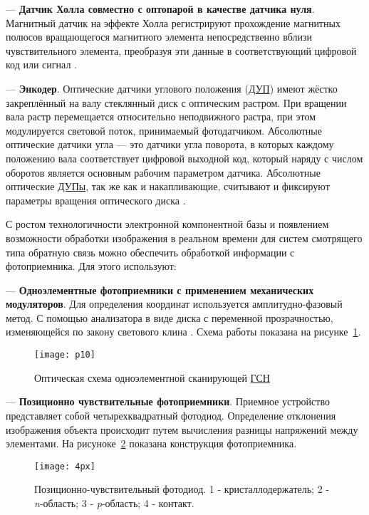 --- \textbf{Датчик Холла совместно с оптопарой в качестве датчика нуля}. Магнитный датчик на эффекте Холла регистрируют прохождение магнитных полюсов вращающегося магнитного элемента непосредственно вблизи чувствительного элемента, преобразуя эти данные в соответствующий цифровой код или сигнал \cite[]{Encoder}.
	
--- \textbf{Энкодер}. Оптические датчики углового положения (\hyperref[acroDUP]{ДУП}) имеют жёстко закреплённый на валу стеклянный диск с оптическим растром. При вращении вала растр перемещается относительно неподвижного растра, при этом модулируется световой поток, принимаемый фотодатчиком. Абсолютные оптические датчики угла — это датчики угла поворота, в которых каждому положению вала соответствует цифровой выходной код, который наряду с числом оборотов является основным рабочим параметром датчика. Абсолютные оптические \hyperref[acroDUP]{ДУПы}, так же как и накапливающие, считывают и фиксируют параметры вращения оптического диска \cite[]{Encoder}.

С ростом технологичности электронной компонентной базы и появлением возможности обработки изображения в реальном времени для систем смотрящего типа обратную связь можно обеспечить обработкой информации с фотоприемника. Для этого используют:

--- \textbf{Одноэлементные фотоприемники с применением механических модуляторов}. Для определения координат используется амплитудно-фазовый метод. С помощью анализатора в виде диска с переменной прозрачностью, изменяющейся по закону светового клина \cite[]{bibook1}. Схема работы показана на рисунке~\ref{fig:p10}.
	
	\begin{figure}[ht]
		\centering
		\texttt{[image: p10]} 
		\caption{Оптическая схема одноэлементной сканирующей \hyperref[acroGSN]{ГСН} }
		\label{fig:p10}
	\end{figure}

--- \textbf{Позиционно чувствительные фотоприемники}. Приемное устройство представляет собой четырехквадратный фотодиод. Определение отклонения изображения объекта происходит путем вычисления разницы напряжений между элементами. На рисуноке~\ref{fig:4px} показана конструкция фотоприемника.	
	\begin{figure}[ht]
		\centering
		\texttt{[image: 4px]} 
		\caption{Позиционно-чувствительный фотодиод. 1 - кристаллодержатель; 2 - \textit{n}-область; 3 - \textit{p}-область; 4 - контакт.}
		\label{fig:4px}
	\end{figure}
	


